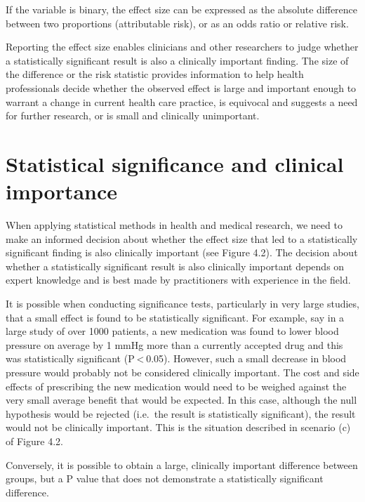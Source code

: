 \documentclass[
]{memoir}
\begin{document}
If the variable is binary, the effect size can be expressed as the absolute difference between two proportions (attributable risk), or as an odds ratio or relative risk.

Reporting the effect size enables clinicians and other researchers to judge whether a statistically significant result is also a clinically important finding. The size of the difference or the risk statistic provides information to help health professionals decide whether the observed effect is large and important enough to warrant a change in current health care practice, is equivocal and suggests a need for further research, or is small and clinically unimportant.

\hypertarget{statistical-significance-and-clinical-importance}{%
\section{Statistical significance and clinical importance}\label{statistical-significance-and-clinical-importance}}

When applying statistical methods in health and medical research, we need to make an informed decision about whether the effect size that led to a statistically significant finding is also clinically important (see Figure 4.2). The decision about whether a statistically significant result is also clinically important depends on expert knowledge and is best made by practitioners with experience in the field.

It is possible when conducting significance tests, particularly in very large studies, that a small effect is found to be statistically significant. For example, say in a large study of over 1000 patients, a new medication was found to lower blood pressure on average by 1 mmHg more than a currently accepted drug and this was statistically significant (P \textless{} 0.05). However, such a small decrease in blood pressure would probably not be considered clinically important. The cost and side effects of prescribing the new medication would need to be weighed against the very small average benefit that would be expected. In this case, although the null hypothesis would be rejected (i.e.~the result is statistically significant), the result would not be clinically important. This is the situation described in scenario (c) of Figure 4.2.

Conversely, it is possible to obtain a large, clinically important difference between groups, but a P value that does not demonstrate a statistically significant difference.
\end{document}
